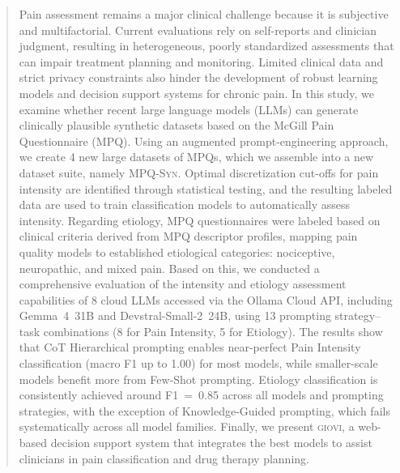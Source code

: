 \documentclass[preprint,12pt,authoryear]{elsarticle}
\newcommand{\system}{\small\textsc{giovi}\xspace}
\newcommand{\dbsuite}{\small\textsc{MPQ-Syn}\xspace}
\begin{document}
\begin{frontmatter}
\begin{abstract}
Pain assessment remains a major clinical challenge because it is subjective and multifactorial. Current evaluations rely on self-reports and clinician judgment, resulting in heterogeneous, poorly standardized assessments that can impair treatment planning and monitoring. Limited clinical data and strict privacy constraints also hinder the development of robust learning models and decision support systems for chronic pain. In this study, we examine whether recent large language models (LLMs) can generate clinically plausible synthetic datasets based on the McGill Pain Questionnaire (MPQ). Using an augmented prompt-engineering approach, we create 4 new large datasets of MPQs, which we assemble into a new dataset suite, namely \dbsuite. Optimal discretization cut-offs for pain intensity are identified through statistical testing, and the resulting labeled data are used to train classification models to automatically assess intensity. Regarding etiology, MPQ questionnaires were labeled based on clinical criteria derived from MPQ descriptor profiles, mapping pain quality models to established etiological categories: nociceptive, neuropathic, and mixed pain. Based on this, we conducted a comprehensive evaluation of the intensity and etiology assessment capabilities of 8 cloud LLMs accessed via the Ollama Cloud API, including Gemma~4~31B and Devstral-Small-2~24B, using 13 prompting strategy--task combinations (8 for Pain Intensity, 5 for Etiology). The results show that CoT Hierarchical prompting enables near-perfect Pain Intensity classification (macro F1 up to 1.00) for most models, while smaller-scale models benefit more from Few-Shot prompting. Etiology classification is consistently achieved around F1~=~0.85 across all models and prompting strategies, with the exception of Knowledge-Guided prompting, which fails systematically across all model families. Finally, we present \system, a web-based decision support system that integrates the best models to assist clinicians in pain classification and drug therapy planning.

\end{abstract}
\end{frontmatter}
\end{document}
